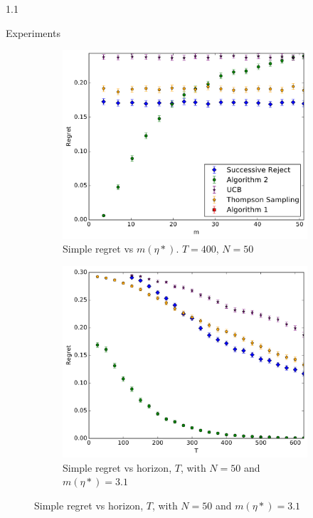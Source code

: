\documentclass[12pt]{beamer}
\newlength{\onecolwid}
\begin{document}
\begin{frame}[t]
\begin{columns}[t]
\begin{column}{1.1\onecolwid}
\begin{block}{Experiments}
\begin{figure}[H]
    \begin{subfigure}[t]{0.3\textwidth}
		\centering    
    		\includegraphics[width=\textwidth]{experiment4_20161023_2120.pdf}
    		\caption{Simple regret vs $m(\eta*)$. $T=400$, $N = 50$}
        \label{fig:simple_vs_m_general}
    \end{subfigure}\hfill
    \begin{subfigure}[t]{0.3\textwidth}
    		\centering
        \includegraphics[width=\textwidth]{experiment7_20161020_1257.pdf}
    		\caption{Simple regret vs horizon, $T$, with $N = 50$ and $m(\eta*)=3.1$ }
        \label{fig:simple_vs_T_general}

\end{subfigure}
\end{figure}
\end{block}
\end{column}
\end{columns}
\end{frame}
\end{document}
